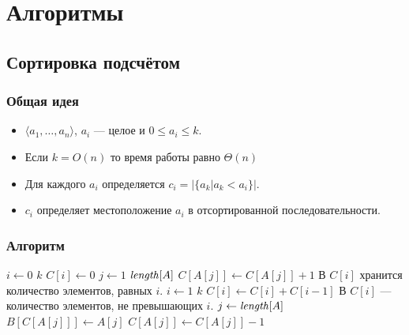 \documentclass[hyperref={unicode=true}]{beamer}
\begin{document}
\section{Алгоритмы}

\subsection{Сортировка подсчётом}

\frame
{
  \frametitle{Общая идея}
  \begin{itemize}
    \item $\langle a_1, \ldots, a_n\rangle$, 
      $a_i$ --- целое и $0 \leq a_i \leq k$.
    \item Если $k = O(n)$ то время работы равно $\Theta(n)$
    \item Для каждого $a_i$ определяется $c_i = \left|\{a_k | a_k <
      a_i\}\right|$.
    \item $c_i$ определяет местоположение $a_i$ в отсортированной
      последовательности. 
  \end{itemize}
}

\frame
{
  \frametitle{Алгоритм}
\begin{codebox} 
\li \For $i \gets 0$ \To $k$ 
\li    \Do $C[i] \gets 0$ \End
\li \For $j \gets 1$ \To $\id{length}[A]$
\li   \Do $C[A[j]] \gets C[A[j]]+1$ \End
\li \Comment В $C[i]$ хранится количество элементов, равных $i$.
\li \For $i \gets 1$ \To $k$
\li    \Do $C[i] \gets C[i]+C[i-1]$ \End
\li \Comment В $C[i]$ --- количество элементов, не превышающих $i$.
\li \For $j \gets \id{length}[A]$ 
\li \Do $B[C[A[j]]]  \gets A[j]$
\li $C[A[j]] \gets C[A[j]] - 1$
\End 
\end{codebox} 

}
\end{document}
